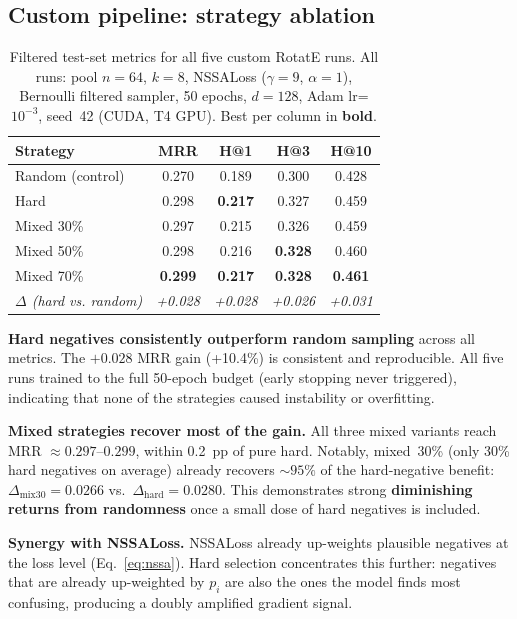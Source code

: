 \documentclass[10pt,twocolumn,letterpaper]{article}
\begin{document}
\subsection{Custom pipeline: strategy ablation}

\begin{table}[h]
\centering\small
\caption{Filtered test-set metrics for all five custom RotatE runs.
All runs: pool $n=64$, $k=8$, NSSALoss ($\gamma=9$, $\alpha=1$),
Bernoulli filtered sampler, 50 epochs, $d=128$, Adam lr=$10^{-3}$, seed~42
(CUDA, T4 GPU). Best per column in \textbf{bold}.}
\label{tab:custom}
\begin{tabular}{@{}lcccc@{}}
\toprule
Strategy & MRR & H@1 & H@3 & H@10 \\
\midrule
Random (control)    & 0.270 & 0.189 & 0.300 & 0.428 \\
Hard                & 0.298 & \textbf{0.217} & 0.327 & 0.459 \\
Mixed 30\%          & 0.297 & 0.215 & 0.326 & 0.459 \\
Mixed 50\%          & 0.298 & 0.216 & \textbf{0.328} & 0.460 \\
Mixed 70\%          & \textbf{0.299} & \textbf{0.217} & \textbf{0.328} & \textbf{0.461} \\
\midrule
\emph{$\Delta$ (hard vs. random)} & \emph{+0.028} & \emph{+0.028} & \emph{+0.026} & \emph{+0.031} \\
\bottomrule
\end{tabular}
\end{table}

\textbf{Hard negatives consistently outperform random sampling} across all
metrics. The $+0.028$ MRR gain (+10.4\%) is consistent and reproducible.
All five runs trained to the full 50-epoch budget (early stopping never
triggered), indicating that none of the strategies caused instability or
overfitting.

\textbf{Mixed strategies recover most of the gain.} All three mixed variants
reach MRR $\approx0.297$--$0.299$, within 0.2~pp of pure hard.
Notably, mixed~30\% (only 30\% hard negatives on average) already recovers
$\sim\!95\%$ of the hard-negative benefit:
$\Delta_{\mathrm{mix30}} = 0.0266$ vs.\ $\Delta_{\mathrm{hard}} = 0.0280$.
This demonstrates strong \textbf{diminishing returns from randomness} once a
small dose of hard negatives is included.

\textbf{Synergy with NSSALoss.}
NSSALoss already up-weights plausible negatives at the loss level
(Eq.~\ref{eq:nssa}). Hard selection concentrates this further: negatives that
are already up-weighted by $p_i$ are also the ones the model finds most
confusing, producing a doubly amplified gradient signal.
\end{document}
